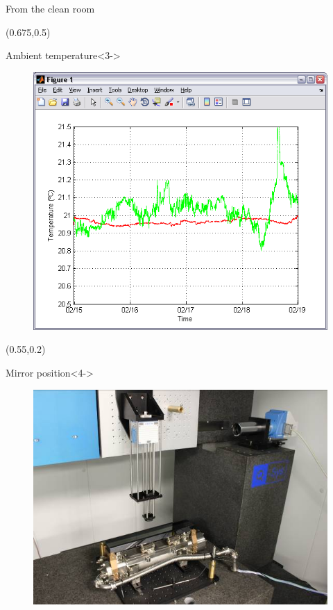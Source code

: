 \documentclass{beamer}
\begin{document}
\begin{frame}
\begin{textblock*}{50mm}
\begin{block}{From the clean room}
\begin{figure}
            \end{figure}
        \end{block}
    \end{textblock*}
    \begin{textblock*}{45mm}(0.675\textwidth,0.5\textheight)
        \begin{block}{Ambient temperature}<3->
            \begin{figure}
                \includegraphics[width=\textwidth]{imgs/alba/laop/02_laop-temperatures.png}
            \end{figure}
        \end{block}
    \end{textblock*}
    \begin{textblock*}{45mm}(0.55\textwidth,0.2\textheight)
        \begin{exampleblock}{Mirror position}<4->
            \begin{figure}
                \includegraphics[width=\textwidth]{imgs/alba/laop/03_detall_LTP_normal_configuration.jpg}

\end{figure}
\end{exampleblock}
\end{textblock*}
\end{frame}
\end{document}
